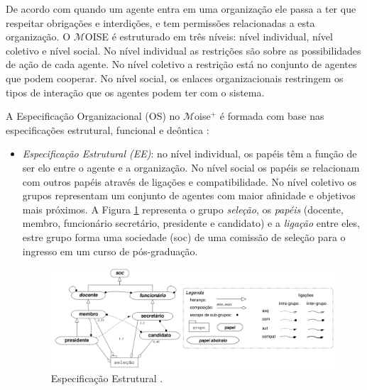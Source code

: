 De acordo com \cite{hannoun2000moise} quando um agente entra em uma organização ele passa a ter que respeitar obrigações e interdições, e tem permissões relacionadas a esta organização. O $\mathcal{M}$OISE é estruturado em três níveis: nível individual, nível coletivo e nível social. No nível individual as restrições são sobre as possibilidades de ação de cada agente. No nível coletivo a restrição está no conjunto de agentes que podem cooperar. No nível social, os enlaces organizacionais restringem os tipos de interação que os agentes podem ter com o sistema.

A Especificação Organizacional (OS) no $\mathcal{M}$oise$^{+}$ é formada com base nas especificações estrutural, funcional e deôntica \cite{hubner2003modelo}:

\begin{itemize}

\item {\it Especificação Estrutural (EE)}: no nível individual, os papéis têm a função de ser elo entre o agente e a organização. No nível social os papéis se relacionam com outros papéis através de ligações e compatibilidade. No nível coletivo os grupos representam um conjunto de agentes com maior afinidade e objetivos mais próximos. A Figura \ref{fig:ee_exemplo} representa o grupo \textit{seleção}, os \textit{papéis} (docente, membro, funcionário secretário, presidente e candidato) e a \textit{ligação} entre eles, estre grupo forma uma sociedade (soc) de uma comissão de seleção para o ingresso em um curso de pós-graduação.

\begin{figure}[ht]
\centering
\includegraphics[scale=0.35]{imagens/modelo3.png}
\caption{Especificação Estrutural \cite{hubner2003modelo}.}
\label{fig:ee_exemplo}
\end{figure}



\end{itemize}
